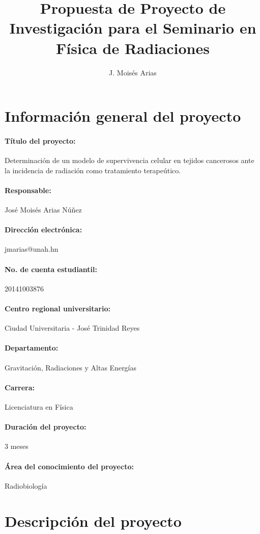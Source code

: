 \documentclass[12pt,letterpaper]{article}
\author{J. Moisés Arias}
\title{Propuesta de Proyecto de Investigación para el Seminario en Física de Radiaciones}
\begin{document}
	\maketitle
	\section*{Información general del proyecto}
		\paragraph{Título del proyecto:} Determinación de un modelo de supervivencia celular en tejidos cancerosos ante la incidencia de radiación como tratamiento terapeútico.
		\paragraph{Responsable:} José Moisés Arias Núñez
		\paragraph{Dirección electrónica:} jmarias@unah.hn
		\paragraph{No. de cuenta estudiantil:} 20141003876
		\paragraph{Centro regional universitario:} Ciudad Universitaria - José Trinidad Reyes
		\paragraph{Departamento:} Gravitación, Radiaciones y Altas Energías
		\paragraph{Carrera:} Licenciatura en Física
		\paragraph{Duración del proyecto:} 3 meses
		\paragraph{Área del conocimiento del proyecto:} Radiobiología
	\section*{Descripción del proyecto}
\end{document}
